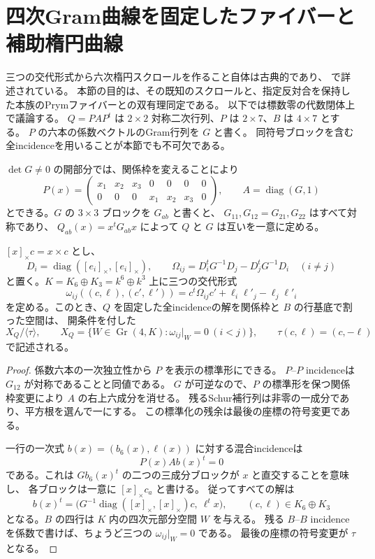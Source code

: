 \section{四次Gram曲線を固定したファイバーと補助楕円曲線}
\label{sec:prym-fiber-v26}
\label{subsec:prym-elliptic-ruled-v26}

三つの交代形式から六次楕円スクロールを作ること自体は古典的であり、\cite{BazanMezzetti} で詳述されている。
本節の目的は、その既知のスクロールと、指定反対合を保持した本族のPrymファイバーとの双有理同定である。
以下では標数零の代数閉体上で議論する。
$Q=PAP^t$ は $2\times2$ 対称二次行列、$P$ は $2\times7$、$B$ は $4\times7$ とする。
$P$ の六本の係数ベクトルのGram行列を $G$ と書く。
同符号ブロックを含む全incidenceを用いることが本節でも不可欠である。

\begin{proposition}[固定GramファイバーのGrassmann表示]
\label{prop:gram-fiber-grassmann-v26}
$\det G\ne0$ の開部分では、関係枠を変えることにより
\[
 P(x)=\begin{pmatrix}x_1&x_2&x_3&0&0&0&0\\
 0&0&0&x_1&x_2&x_3&0\end{pmatrix},\qquad
 A=\operatorname{diag}(G,1)
\]
とできる。$G$ の $3\times3$ ブロックを $G_{ab}$ と書くと、
$G_{11},G_{12}=G_{21},G_{22}$ はすべて対称であり、
$Q_{ab}(x)=x^tG_{ab}x$ によって $Q$ と $G$ は互いを一意に定める。

$[x]_\times c=x\times c$ とし、
\[
 D_i=\operatorname{diag}([e_i]_\times,[e_i]_\times),\qquad
 \Omega_{ij}=D_i^tG^{-1}D_j-D_j^tG^{-1}D_i\quad(i\ne j)
\]
と置く。$K=K_6\oplus K_3=k^6\oplus k^3$ 上に三つの交代形式
\[
 \omega_{ij}((c,\ell),(c',\ell'))
 =c^t\Omega_{ij}c'+\ell_i\ell'_j-\ell_j\ell'_i
\]
を定める。このとき、$Q$ を固定した全incidenceの解を関係枠と $B$ の行基底で割った空間は、
開条件を付した
\[
 X_Q/\langle\tau\rangle,\qquad
 X_Q=\{W\in\operatorname{Gr}(4,K):\omega_{ij}|_W=0\ (i<j)\},\qquad
 \tau(c,\ell)=(c,-\ell)
\]
で記述される。
\end{proposition}

\begin{proof}
係数六本の一次独立性から $P$ を表示の標準形にできる。
$P$--$P$ incidenceは $G_{12}$ が対称であることと同値である。
$G$ が可逆なので、$P$ の標準形を保つ関係枠変更により $A$ の右上六成分を消せる。
残るSchur補行列は非零の一成分であり、平方根を選んで一にする。
この標準化の残余は最後の座標の符号変更である。

一行の一次式 $b(x)=(b_6(x),\ell(x))$ に対する混合incidenceは
\[
 P(x)Ab(x)^t=0
\]
である。これは $G b_6(x)^t$ の二つの三成分ブロックが $x$ と直交することを意味し、
各ブロックは一意に $[x]_\times c_a$ と書ける。
従ってすべての解は
\[
 b(x)^t=\bigl(G^{-1}\operatorname{diag}([x]_\times,[x]_\times)c,\ \ell^tx\bigr),
 \qquad(c,\ell)\in K_6\oplus K_3
\]
となる。$B$ の四行は $K$ 内の四次元部分空間 $W$ を与える。
残る $B$--$B$ incidenceを係数で書けば、ちょうど三つの $\omega_{ij}|_W=0$ である。
最後の座標の符号変更が $\tau$ となる。
\end{proof}

